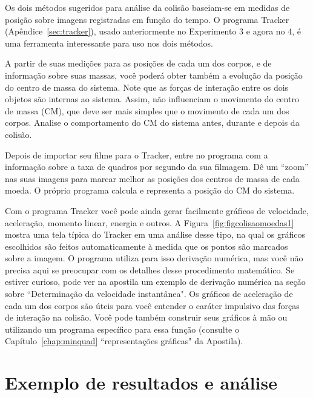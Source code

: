 Os dois métodos sugeridos para análise da colisão baseiam-se em medidas de posição sobre imagens registradas em função do tempo. O programa Tracker (Apêndice~\ref{sec:tracker}), usado anteriormente no Experimento 3 e agora no 4, é uma ferramenta interessante para uso nos dois métodos. 

A partir de suas medições para as posições de cada um dos corpos, e de informação sobre suas massas, você poderá obter também a evolução da posição do centro de massa do sistema. Note que as forças de interação entre os dois objetos são internas ao sistema. Assim, não influenciam o movimento do centro de massa (CM), que deve ser mais simples que o movimento de cada um dos corpos. Analise o comportamento do CM do sistema antes, durante e depois da colisão.

Depois de importar seu filme para o Tracker, entre no programa com a informação sobre a taxa de quadros por segundo da sua filmagem. Dê um ``zoom'' nas suas imagens para marcar melhor as posições dos centros de massa de cada moeda. O próprio programa calcula e representa a posição do CM do sistema.

Com o programa Tracker você pode ainda gerar facilmente gráficos de velocidade, aceleração, momento linear, energia e outros. 
A Figura~\ref{fig:figcolisaomoedas1} mostra uma tela típica do Tracker em uma análise desse tipo, na qual os gráficos escolhidos são feitos automaticamente à medida que os pontos são marcados sobre a imagem. O programa utiliza para isso derivação numérica, mas você não precisa aqui se preocupar com os detalhes desse procedimento matemático. Se estiver curioso, pode ver na apostila um exemplo de derivação numérica na seção sobre  “Determinação da velocidade instantânea". Os gráficos de aceleração de cada um dos corpos são úteis para você entender o caráter impulsivo das forças de interação na colisão. Você pode também construir seus gráficos à mão ou utilizando um programa específico para essa função (consulte o Capítulo~\ref{chap:minquad} “representações gráficas"  da Apostila). 




 
\section{Exemplo de resultados e análise}


